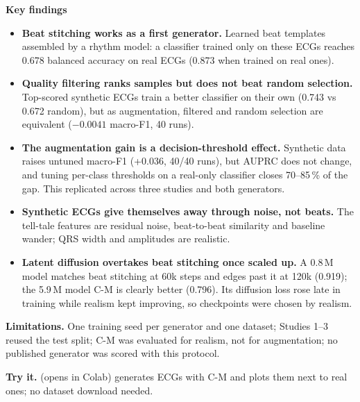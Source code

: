 \documentclass[10pt,a4paper]{article}
\begin{document}
\noindent\textbf{Key findings}
\begin{itemize}
\item \textbf{Beat stitching works as a first generator.} Learned beat templates assembled by a rhythm model: a
  classifier trained only on these ECGs reaches 0.678 balanced accuracy on real ECGs (0.873 when trained on real ones).
\item \textbf{Quality filtering ranks samples but does not beat random selection.} Top-scored synthetic ECGs train a
  better classifier on their own (0.743 vs 0.672 random), but as augmentation, filtered and random selection are
  equivalent ($-0.0041$ macro-F1, 40 runs).
\item \textbf{The augmentation gain is a decision-threshold effect.} Synthetic data raises untuned macro-F1
  (+0.036, 40/40 runs), but AUPRC does not change, and tuning per-class thresholds on a real-only classifier closes
  70--85\,\% of the gap. This replicated across three studies and both generators.
\item \textbf{Synthetic ECGs give themselves away through noise, not beats.} The tell-tale features are residual
  noise, beat-to-beat similarity and baseline wander; QRS width and amplitudes are realistic.
\item \textbf{Latent diffusion overtakes beat stitching once scaled up.} A 0.8\,M model matches beat stitching
  at 60k steps and edges past it at 120k (0.919); the 5.9\,M model C-M is clearly better (0.796). Its diffusion loss rose late in training while realism kept
  improving, so checkpoints were chosen by realism.
\end{itemize}

\noindent\textbf{Limitations.} One training seed per generator and one dataset; Studies 1--3 reused the test split;
C-M was evaluated for realism, not for augmentation; no published generator was scored with this protocol.

\smallskip
\noindent\textbf{Try it.}  (opens in Colab) generates ECGs with C-M and
plots them next to real ones; no dataset download needed.
\end{document}

